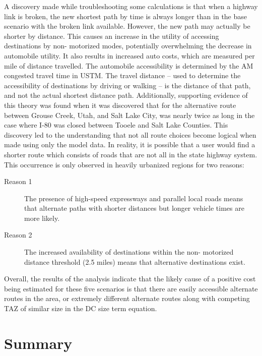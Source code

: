 A discovery made while troubleshooting some calculations is that when a highway link is broken, the new
shortest path by time is always longer than in the base scenario with the broken link
available. However, the new path may actually be shorter by distance. This
causes an increase in the utility of accessing destinations by non-
motorized modes, potentially overwhelming the decrease in automobile
utility. It also results in increased auto costs, which are measured per mile of distance travelled. The automobile accessibility is determined by the AM congested
travel time in USTM. The travel distance
– used to determine the accessibility of destinations by driving or
walking – is the distance of that path, and not the actual shortest
distance path. Additionally,
supporting evidence of this theory was found when it was discovered that for
the alternative route between Grouse Creek, Utah, and Salt Lake City,
was nearly twice as long in the case where I-80 was closed between
Tooele and Salt Lake Counties. This discovery led to the understanding that not all
route choices become logical when made using only the model data. In
reality, it is possible that a user would find a shorter route
which consists of roads that are not all in the state highway system.
This occurrence is only observed in heavily urbanized regions for two reasons:
\begin{description}
	\item [Reason 1]{The presence of high-speed expressways and parallel local roads
  means that alternate paths with shorter distances but longer vehicle
  times are more likely.}
	\item [Reason 2]{The increased availability of destinations within the non-
  motorized distance threshold (2.5 miles) means that alternative
  destinations exist.}
\end{description}

Overall, the results of the analysis indicate that the likely cause of a
positive cost being estimated for these five scenarios is that there are
easily
accessible alternate routes in the area, or extremely different alternate
routes along with competing TAZ of similar size in the DC size term
equation.

\section{Summary}

